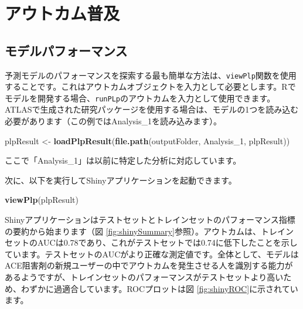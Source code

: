 \documentclass[
  11pt]{book}
\newenvironment{Shaded}{\begin{snugshade}}{\end{snugshade}}
\newcommand{\FunctionTok}[1]{\textcolor[rgb]{0.13,0.29,0.53}{\textbf{#1}}}
\newcommand{\NormalTok}[1]{#1}
\newcommand{\OtherTok}[1]{\textcolor[rgb]{0.56,0.35,0.01}{#1}}
\newcommand{\StringTok}[1]{\textcolor[rgb]{0.31,0.60,0.02}{#1}}
\theoremstyle{definition}
\theoremstyle{definition}
\theoremstyle{definition}
\theoremstyle{definition}
\theoremstyle{remark}
\begin{document}
\section{アウトカム普及}\label{ux30a2ux30a6ux30c8ux30abux30e0ux666eux53ca}

\subsection{モデルパフォーマンス}\label{ux30e2ux30c7ux30ebux30d1ux30d5ux30a9ux30fcux30deux30f3ux30b9}

予測モデルのパフォーマンスを探索する最も簡単な方法は、\texttt{viewPlp}関数を使用することです。これはアウトカムオブジェクトを入力として必要とします。Rでモデルを開発する場合、\texttt{runPLp}のアウトカムを入力として使用できます。ATLASで生成された研究パッケージを使用する場合は、モデルの1つを読み込む必要があります（この例ではAnalysis\_1を読み込みます）。

\begin{Shaded}
\begin{Highlighting}[]
\NormalTok{plpResult }\OtherTok{\textless{}{-}} \FunctionTok{loadPlpResult}\NormalTok{(}\FunctionTok{file.path}\NormalTok{(outputFolder,}
                                     \StringTok{\textquotesingle{}Analysis\_1\textquotesingle{}}\NormalTok{,}
                                     \StringTok{\textquotesingle{}plpResult\textquotesingle{}}\NormalTok{))}
\end{Highlighting}
\end{Shaded}

ここで「Analysis\_1」は以前に特定した分析に対応しています。

次に、以下を実行してShinyアプリケーションを起動できます。

\begin{Shaded}
\begin{Highlighting}[]
\FunctionTok{viewPlp}\NormalTok{(plpResult)}
\end{Highlighting}
\end{Shaded}

Shinyアプリケーションはテストセットとトレインセットのパフォーマンス指標の要約から始まります（図 \ref{fig:shinySummary}参照）。アウトカムは、トレインセットのAUCは0.78であり、これがテストセットでは0.74に低下したことを示しています。テストセットのAUCがより正確な測定値です。全体として、モデルはACE阻害剤の新規ユーザーの中でアウトカムを発生させる人を識別する能力があるようですが、トレインセットのパフォーマンスがテストセットより高いため、わずかに過適合しています。ROCプロットは図 \ref{fig:shinyROC}に示されています。
\end{document}
